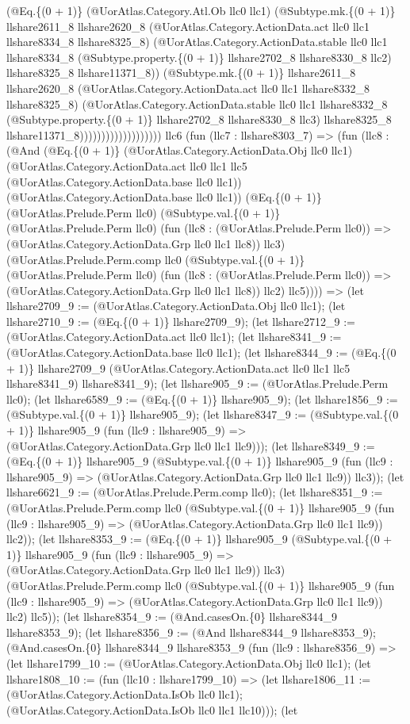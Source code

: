 \documentclass[11pt]{article}
\begin{document}
(@Eq.\{(0 + 1)\} (@UorAtlas.Category.Atl.Ob llc0 llc1) (@Subtype.mk.\{(0 + 1)\} llshare2611\_8 llshare2620\_8 (@UorAtlas.Category.ActionData.act llc0 llc1 llshare8334\_8 llshare8325\_8) (@UorAtlas.Category.ActionData.stable llc0 llc1 llshare8334\_8 (@Subtype.property.\{(0 + 1)\} llshare2702\_8 llshare8330\_8 llc2) llshare8325\_8 llshare11371\_8)) (@Subtype.mk.\{(0 + 1)\} llshare2611\_8 llshare2620\_8 (@UorAtlas.Category.ActionData.act llc0 llc1 llshare8332\_8 llshare8325\_8) (@UorAtlas.Category.ActionData.stable llc0 llc1 llshare8332\_8 (@Subtype.property.\{(0 + 1)\} llshare2702\_8 llshare8330\_8 llc3) llshare8325\_8 llshare11371\_8))))))))))))))))))) llc6 (fun (llc7 : llshare8303\_7) => (fun (llc8 : (@And (@Eq.\{(0 + 1)\} (@UorAtlas.Category.ActionData.Obj llc0 llc1) (@UorAtlas.Category.ActionData.act llc0 llc1 llc5 (@UorAtlas.Category.ActionData.base llc0 llc1)) (@UorAtlas.Category.ActionData.base llc0 llc1)) (@Eq.\{(0 + 1)\} (@UorAtlas.Prelude.Perm llc0) (@Subtype.val.\{(0 + 1)\} (@UorAtlas.Prelude.Perm llc0) (fun (llc8 : (@UorAtlas.Prelude.Perm llc0)) => (@UorAtlas.Category.ActionData.Grp llc0 llc1 llc8)) llc3) (@UorAtlas.Prelude.Perm.comp llc0 (@Subtype.val.\{(0 + 1)\} (@UorAtlas.Prelude.Perm llc0) (fun (llc8 : (@UorAtlas.Prelude.Perm llc0)) => (@UorAtlas.Category.ActionData.Grp llc0 llc1 llc8)) llc2) llc5)))) => (let llshare2709\_9 := (@UorAtlas.Category.ActionData.Obj llc0 llc1); (let llshare2710\_9 := (@Eq.\{(0 + 1)\} llshare2709\_9); (let llshare2712\_9 := (@UorAtlas.Category.ActionData.act llc0 llc1); (let llshare8341\_9 := (@UorAtlas.Category.ActionData.base llc0 llc1); (let llshare8344\_9 := (@Eq.\{(0 + 1)\} llshare2709\_9 (@UorAtlas.Category.ActionData.act llc0 llc1 llc5 llshare8341\_9) llshare8341\_9); (let llshare905\_9 := (@UorAtlas.Prelude.Perm llc0); (let llshare6589\_9 := (@Eq.\{(0 + 1)\} llshare905\_9); (let llshare1856\_9 := (@Subtype.val.\{(0 + 1)\} llshare905\_9); (let llshare8347\_9 := (@Subtype.val.\{(0 + 1)\} llshare905\_9 (fun (llc9 : llshare905\_9) => (@UorAtlas.Category.ActionData.Grp llc0 llc1 llc9))); (let llshare8349\_9 := (@Eq.\{(0 + 1)\} llshare905\_9 (@Subtype.val.\{(0 + 1)\} llshare905\_9 (fun (llc9 : llshare905\_9) => (@UorAtlas.Category.ActionData.Grp llc0 llc1 llc9)) llc3)); (let llshare6621\_9 := (@UorAtlas.Prelude.Perm.comp llc0); (let llshare8351\_9 := (@UorAtlas.Prelude.Perm.comp llc0 (@Subtype.val.\{(0 + 1)\} llshare905\_9 (fun (llc9 : llshare905\_9) => (@UorAtlas.Category.ActionData.Grp llc0 llc1 llc9)) llc2)); (let llshare8353\_9 := (@Eq.\{(0 + 1)\} llshare905\_9 (@Subtype.val.\{(0 + 1)\} llshare905\_9 (fun (llc9 : llshare905\_9) => (@UorAtlas.Category.ActionData.Grp llc0 llc1 llc9)) llc3) (@UorAtlas.Prelude.Perm.comp llc0 (@Subtype.val.\{(0 + 1)\} llshare905\_9 (fun (llc9 : llshare905\_9) => (@UorAtlas.Category.ActionData.Grp llc0 llc1 llc9)) llc2) llc5)); (let llshare8354\_9 := (@And.casesOn.\{0\} llshare8344\_9 llshare8353\_9); (let llshare8356\_9 := (@And llshare8344\_9 llshare8353\_9); (@And.casesOn.\{0\} llshare8344\_9 llshare8353\_9 (fun (llc9 : llshare8356\_9) => (let llshare1799\_10 := (@UorAtlas.Category.ActionData.Obj llc0 llc1); (let llshare1808\_10 := (fun (llc10 : llshare1799\_10) => (let llshare1806\_11 := (@UorAtlas.Category.ActionData.IsOb llc0 llc1); (@UorAtlas.Category.ActionData.IsOb llc0 llc1 llc10))); (let 
\end{document}
